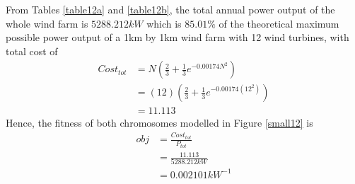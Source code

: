         From Tables \ref{table12a} and \ref{table12b}, the total annual power output of the whole wind farm is $5288.212kW$ which is $85.01\%$ of the theoretical maximum possible power output of a 1km by 1km wind farm with 12 wind turbines, with total cost of
        \begin{align*}
            Cost_{tot}
            &= N\left(\frac{2}{3} + \frac{1}{3}e^{-0.00174N^2}\right) \\
            &= \left(12\right)\left(\frac{2}{3} + \frac{1}{3}e^{-0.00174\left(12^2\right)}\right) \\
            &=11.113
        \end{align*}
        Hence, the fitness of both chromosomes modelled in Figure \ref{small12} is
        \begin{align*}
            obj
            &=\frac{Cost_{tot}}{P_{tot}} \\
            &=\frac{11.113}{5288.212kW} \\
            &=0.002101kW^{-1}
        \end{align*} 
        
